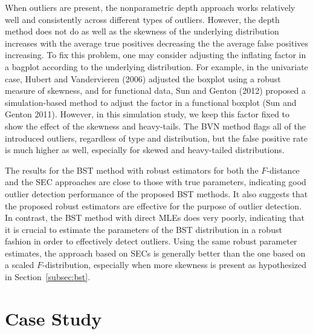\documentclass[12pt]{article}
\begin{document}
\begin{doublespacing}
When outliers are present, the nonparametric depth approach works relatively well and consistently across different types of outliers.  However, the depth method does not do as well as the skewness of the underlying distribution increases with the average true positives decreasing the the average false positives increasing.  To fix this problem, one may consider adjusting the inflating factor in a bagplot according to the underlying distribution. For example, in the univariate case, Hubert and Vandervieren (2006) adjusted the boxplot using a robust measure of skewness, and for functional data, Sun and Genton (2012) proposed a simulation-based method to adjust the factor in a functional boxplot (Sun and Genton 2011).  However, in this simulation study, we keep this factor fixed to show the effect of the skewness and heavy-tails.  The BVN method flags all of the introduced outliers, regardless of type and distribution, but the false positive rate is much higher as well,  especially for skewed and heavy-tailed distributions. 

The results for the BST method with robust estimators for both the $F$-distance and the SEC approaches are close to those with true parameters, indicating good outlier detection performance of the proposed BST methods.  It also suggests that the proposed robust estimators are effective for the purpose of outlier detection. In contrast, the BST method with direct MLEs does very poorly, indicating that it is crucial to estimate the parameters of the BST distribution in a robust fashion in order to effectively detect outliers. Using the same robust parameter estimates, the approach based on SECs is generally better than the one based on a scaled $F$-distribution, especially when more skewness is present as hypothesized in Section~\ref{subsec:bst}. 



\section{Case Study}\label{sec:app}


\end{doublespacing}
\end{document}
